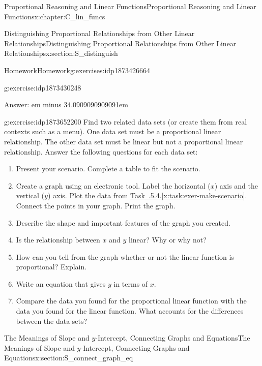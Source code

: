 \documentclass[oneside,10pt,]{book}
\newcommand{\xreffont}{\relax}
\newcommand{\fillin}[1]{\leavevmode\leaders\vrule height -1.2pt depth 1.5pt \hskip #1em minus #1em \null}
\numberwithin{equation}{chapter}
\begin{document}
\begin{chapterptx}{Proportional Reasoning and Linear Functions}{}{Proportional Reasoning and Linear Functions}{}{}{x:chapter:C_lin_funcs}
\begin{sectionptx}{Distinguishing Proportional Relationships from Other Linear Relationships}{}{Distinguishing Proportional Relationships from Other Linear Relationships}{}{}{x:section:S_distinguish}
\begin{exercises-subsection}{Homework}{}{Homework}{}{}{g:exercises:idp1873426664}
\begin{divisionexercise}{3}{}{}{g:exercise:idp1873430248}
\begin{enumerate}[font=\bfseries,label=(\alph*),ref=\alph*]
\begin{enumerate}[font=\bfseries,label=(\roman*),ref=\theenumi.\roman*]
Answer: \fillin{34.0909090909091}%
\end{enumerate}
\end{enumerate}
\end{divisionexercise}%
\begin{divisionexercise}{4}{}{}{g:exercise:idp1873652200}%
Find two related data sets (or create them from real contexts such as a menu). One data set must be a proportional linear relationship. The other data set must be linear but not a proportional linear relationship. Answer the following questions for each data set:%
\begin{enumerate}[font=\bfseries,label=(\alph*),ref=\alph*]
\item\label{x:task:exer-make-scenario}Present your scenario. Complete a table to fit the scenario.%
\item{}Create a graph using an electronic tool. Label the horizontal (\(x\)) axis and the vertical (\(y\)) axis. Plot the data from \hyperref[x:task:exer-make-scenario]{Task~{\xreffont 2.6.5.4}.{\xreffont\ref{x:task:exer-make-scenario}}}. Connect the points in your graph. Print the graph.%
\item{}Describe the shape and important features of the graph you created.%
\item{}Is the relationship between \(x\) and \(y\) linear? Why or why not?%
\item{}How can you tell from the graph whether or not the linear function is proportional? Explain.%
\item{}Write an equation that gives \(y\) in terms of \(x\).%
\item{}Compare the data you found for the proportional linear function with the data you found for the linear function. What accounts for the differences between the data sets?%
\end{enumerate}
\end{divisionexercise}%
\end{exercises-subsection}
\end{sectionptx}
%
%
\typeout{************************************************}
\typeout{************************************************}
%
\begin{sectionptx}{The Meanings of Slope and \(y\)-Intercept, Connecting Graphs and Equations}{}{The Meanings of Slope and \(y\)-Intercept, Connecting Graphs and Equations}{}{}{x:section:S_connect_graph_eq}
%
%
\typeout{************************************************}

\end{sectionptx}
\end{chapterptx}
\end{document}
